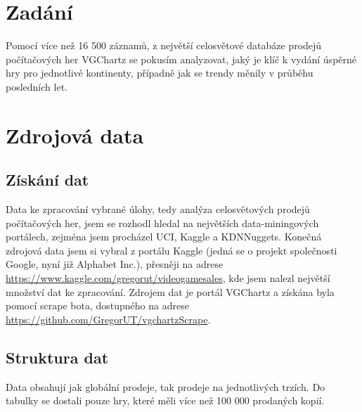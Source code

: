 \documentclass[FM,ZP]{tulthesis}
\begin{document}
\renewcommand{\baselinestretch}{1.50}
\setlength\parindent{1.2cm}
\selectfont
	
\begingroup
\renewcommand{\cleardoublepage}{}
\renewcommand{\clearpage}{}
\chapter{Zadání}
\endgroup
Pomocí více než 16 500 záznamů, z největší celosvětové databáze prodejů počítačových her VGChartz se pokusím analyzovat, jaký je klíč k vydání úspěrné hry pro jednotlivé kontinenty, případně jak se trendy měnily v průběhu posledních let.
	
\begingroup
\renewcommand{\cleardoublepage}{}
\renewcommand{\clearpage}{}
\newpage
\chapter{Zdrojová data}
\endgroup

\section{Získání dat}
Data ke zpracování vybrané úlohy, tedy analýza celosvětových prodejů počítačových her, jsem se rozhodl hledal na největších data-miningových portálech, zejména jsem procházel UCI, Kaggle a KDNNuggets. Konečná zdrojová data jsem si vybral z portálu Kaggle (jedná se o projekt společnosti Google, nyní již Alphabet Inc.), přesněji na adrese \url{https://www.kaggle.com/gregorut/videogamesales}, kde jsem nalezl největší množství dat ke zpracování. Zdrojem dat je portál VGChartz a získána byla pomocí scrape bota, dostupného na adrese \url{https://github.com/GregorUT/vgchartzScrape}.

\section{Struktura dat}
Data obsahují jak globální prodeje, tak prodeje na jednotlivých trzích. Do tabulky se dostali pouze hry, které měli více než 100 000 prodaných kopií.
\end{document}
